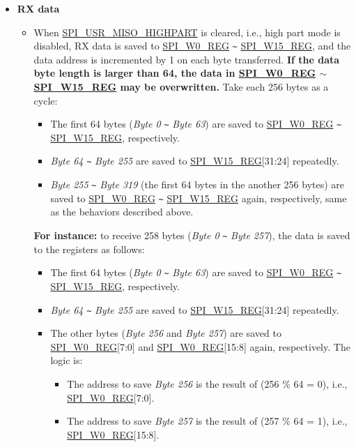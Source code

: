 \documentclass[main\_\_EN.tex]{subfiles}
\begin{document}
\begin{itemize}
    \item \textbf{RX data}
    \begin{itemize}
        \item When \hyperref[fielddesc:SPIUSRMISOHIGHPART]{SPI\_USR\_MISO\_HIGHPART} is cleared, i.e., high part mode is disabled, RX data is saved to \hyperref[regdesc:SPIW0REG]{SPI\_W0\_REG} \verb+~+ \hyperref[regdesc:SPIW0REG]{SPI\_W15\_REG}, and the data address is incremented by 1 on each byte transferred. \textbf{If the data byte length is larger than 64, the data in \hyperref[regdesc:SPIW0REG]{SPI\_W0\_REG} $\sim$ \hyperref[regdesc:SPIW0REG]{SPI\_W15\_REG} may be overwritten.} Take each 256 bytes as a cycle:
        \begin{itemize}
            \item The first 64 bytes (\emph{Byte 0} \verb+~+ \emph{Byte 63}) are saved to \hyperref[regdesc:SPIW0REG]{SPI\_W0\_REG} \verb+~+ \hyperref[regdesc:SPIW0REG]{SPI\_W15\_REG}, respectively.
            \item \emph{Byte 64} \verb+~+ \emph{Byte 255} are saved to \hyperref[regdesc:SPIW0REG]{SPI\_W15\_REG}[31:24] repeatedly.
            \item \emph{Byte 255} \verb+~+ \emph{Byte 319} (the first 64 bytes in the another 256 bytes) are saved to \hyperref[regdesc:SPIW0REG]{SPI\_W0\_REG} \verb+~+ \hyperref[regdesc:SPIW0REG]{SPI\_W15\_REG} again, respectively, same as the behaviors described above.
        \end{itemize}
        
        \textbf{For instance:} to receive 258 bytes (\emph{Byte 0} \verb+~+ \emph{Byte 257}), the data is saved to the registers as follows:
        \begin{itemize}
            \item The first 64 bytes (\emph{Byte 0} \verb+~+ \emph{Byte 63}) are saved to \hyperref[regdesc:SPIW0REG]{SPI\_W0\_REG} \verb+~+ \hyperref[regdesc:SPIW0REG]{SPI\_W15\_REG}, respectively.
            \item \emph{Byte 64} \verb+~+ \emph{Byte 255} are saved to \hyperref[regdesc:SPIW0REG]{SPI\_W15\_REG}[31:24] repeatedly.
            \item The other bytes (\emph{Byte 256} and \emph{Byte 257}) are saved to \hyperref[regdesc:SPIW0REG]{SPI\_W0\_REG}[7:0] and \hyperref[regdesc:SPIW0REG]{SPI\_W0\_REG}[15:8] again, respectively. The logic is:
            \begin{itemize}
                \item The address to save \emph{Byte 256} is the result of (256 \% 64 = 0), i.e., \hyperref[regdesc:SPIW0REG]{SPI\_W0\_REG}[7:0].
                \item The address to save \emph{Byte 257} is the result of (257 \% 64 = 1), i.e., \hyperref[regdesc:SPIW0REG]{SPI\_W0\_REG}[15:8].
            \end{itemize}
        \end{itemize}
        

\end{itemize}
\end{itemize}
\end{document}
